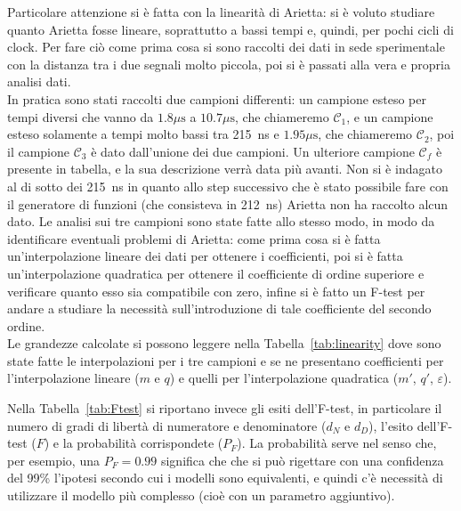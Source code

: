 Particolare attenzione si è fatta con la linearità di Arietta: si è voluto studiare quanto Arietta fosse lineare, soprattutto a bassi tempi e, quindi, per pochi cicli di clock. Per fare ciò come prima cosa si sono raccolti dei dati in sede sperimentale con la distanza tra i due segnali molto piccola, poi si è passati alla vera e propria analisi dati.\\

In pratica sono stati raccolti due campioni differenti: un campione esteso per tempi diversi che vanno da $1.8 \mu\text{s}$ a $10.7 \mu\text{s}$, che chiameremo $\mathcal{C}_1$, e un campione esteso solamente a tempi molto bassi tra 215~ns e $1.95\mu\text{s}$, che chiameremo $\mathcal{C}_2$, poi il campione $\mathcal{C}_3$ è dato dall'unione dei due campioni. Un ulteriore campione $\mathcal{C}_f$ è presente in tabella, e la sua descrizione verrà data più avanti. Non si è indagato al di sotto dei 215~ns in quanto allo step successivo che è stato possibile fare con il generatore di funzioni (che consisteva in 212~ns) Arietta non ha raccolto alcun dato. Le analisi sui tre campioni sono state fatte allo stesso modo, in modo da identificare eventuali problemi di Arietta: come prima cosa si è fatta un'interpolazione lineare dei dati per ottenere i coefficienti, poi si è fatta un'interpolazione quadratica per ottenere il coefficiente di ordine superiore e verificare quanto esso sia compatibile con zero, infine si è fatto un F-test per andare a studiare la necessità sull'introduzione di tale coefficiente del secondo ordine.\\

Le grandezze calcolate si possono leggere nella Tabella~\ref{tab:linearity} dove sono state fatte le interpolazioni per i tre campioni e se ne presentano coefficienti per l'interpolazione lineare ($m$ e $q$) e quelli per l'interpolazione quadratica ($m'$, $q'$, $\varepsilon$).\\

Nella Tabella~\ref{tab:Ftest} si riportano invece gli esiti dell'F-test, in particolare il numero di gradi di libertà di numeratore e denominatore ($d_N$ e $d_D$), l'esito dell'F-test ($F$) e la probabilità corrispondete ($P_F$). La probabilità serve nel senso che, per esempio, una $P_F = 0.99$ significa che che si può rigettare con una confidenza del 99\% l'ipotesi secondo cui i modelli sono equivalenti, e quindi c'è necessità di utilizzare il modello più complesso (cioè con un parametro aggiuntivo).\\

